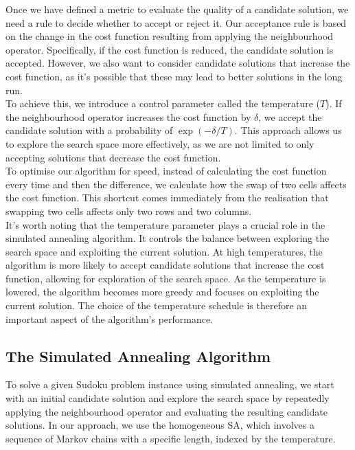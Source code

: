 \documentclass[11pt]{report}
\begin{document}
Once we have defined a metric to evaluate the quality of a candidate solution, we need a rule to decide whether to accept or reject it. Our acceptance rule is based on the change in the cost function resulting from applying the neighbourhood operator. Specifically, if the cost function is reduced, the candidate solution is accepted. However, we also want to consider candidate solutions that increase the cost function, as it's possible that these may lead to better solutions in the long run.
\\

To achieve this, we introduce a control parameter called the temperature ($T$). If the neighbourhood operator increases the cost function by $\delta$, we accept the candidate solution with a probability of $\exp(-\delta/T)$. This approach allows us to explore the search space more effectively, as we are not limited to only accepting solutions that decrease the cost function.
\\

To optimise our algorithm for speed, instead of calculating the cost function every time and then the difference, we calculate how the swap of two cells affects the cost function. This  shortcut comes immediately from the realisation that swapping two cells affects only two rows and two columns.
\\

It's worth noting that the temperature parameter plays a crucial role in the simulated annealing algorithm. It controls the balance between exploring the search space and exploiting the current solution. At high temperatures, the algorithm is more likely to accept candidate solutions that increase the cost function, allowing for exploration of the search space. As the temperature is lowered, the algorithm becomes more greedy and focuses on exploiting the current solution. The choice of the temperature schedule is therefore an important aspect of the algorithm's performance.


\subsection*{The Simulated Annealing Algorithm}

To solve a given Sudoku problem instance using simulated annealing, we start with an initial candidate solution and explore the search space by repeatedly applying the neighbourhood operator and evaluating the resulting candidate solutions. In our approach, we use the homogeneous SA, which involves a sequence of Markov chains with a specific length, indexed by the temperature.
\\
\end{document}
